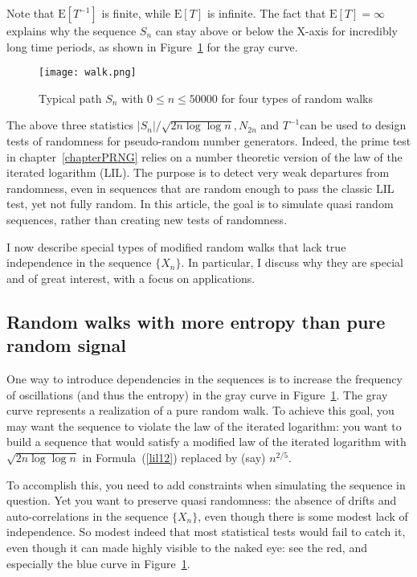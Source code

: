 \documentclass[oneside,10pt]{book}
\begin{document}
\noindent Note that $\text{E}[T^{-1}]$ is finite, while $\text{E}[T]$ is infinite. The fact that
 $\text{E}[T]=\infty$ explains why the sequence $S_n$ can stay above or below the X-axis for incredibly long time periods, as shown
 in Figure~\ref{fig:walk} for the gray curve. 

\begin{figure}%
\centering
\texttt{[image: walk.png]}  
\caption{Typical path $S_n$ with $0\leq n\leq \num{50000}$ for four types of random walks}
\label{fig:walk}
\end{figure}

The above three statistics $|S_n|/\sqrt{2n\log\log n}, N_{2n}$ and $T^{-1}$can be used to design tests of randomness for pseudo-random number generators. Indeed, the \textcolor{index}{prime test} in chapter~\ref{chapterPRNG}  relies on a number theoretic version of the law of the iterated logarithm (LIL). The purpose is to detect very weak departures from randomness, even in sequences that are random enough to pass the classic LIL test, yet not fully random. In this article, the goal is to
 simulate quasi random sequences, rather than creating new tests of randomness.
 
I now describe special types of modified random walks that lack true independence in the sequence $\{X_n\}$. In particular, I discuss why
 they are special and of great interest, with a focus on applications.


\subsection{Random walks with more entropy than pure random signal}\label{azxa}

One way to introduce dependencies in the sequences is to increase the frequency of oscillations (and thus the entropy) in the gray curve in 
 Figure~\ref{fig:walk}. The gray curve represents a realization of a pure random walk. 
 To achieve this goal, you may want the sequence to violate the law of the iterated logarithm: you want to build a sequence that would satisfy a modified law of the iterated logarithm with $\sqrt{2n\log\log n}$ in Formula~(\ref{lil12}) replaced by (say) $n^{2/5}$. 

To accomplish this, you need to add constraints when simulating the sequence in question.  Yet you want to preserve quasi randomness: 
the absence of drifts and auto-correlations in 
 the sequence $\{X_n\}$, even though there is some modest lack of independence. So modest indeed that most statistical tests would fail to catch it, even though it can made highly visible to the naked eye: see the red, and especially the blue curve in Figure~\ref{fig:walk}. 
\end{document}
